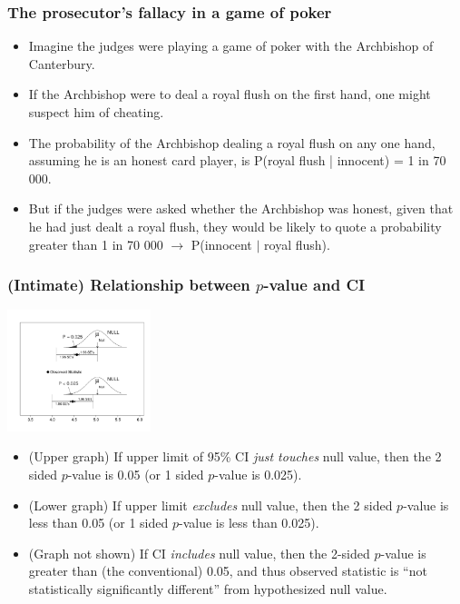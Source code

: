 \documentclass[10pt,handout]{beamer}\usepackage[]{graphicx}\usepackage[]{color}
\begin{document}
\begin{frame}
	\frametitle{The prosecutor's fallacy in a game of poker}
	
	\begin{itemize}
		\setlength\itemsep{1em}
		\item  Imagine the judges were playing a game of poker with the Archbishop of Canterbury. 
		\item If the Archbishop were to deal a royal flush on the first hand, one might suspect him of cheating. \pause 
		\item The probability of the Archbishop dealing a royal flush on any one hand, assuming he is an honest card player, is P(royal flush | innocent) = 1 in 70 000. \pause 
		\item But if the judges were asked whether the Archbishop was honest, given that he had just dealt a royal flush, they would be likely to quote a probability greater than 1 in 70 000 $\to$ P(innocent $|$ royal flush). 
	\end{itemize}
	
\end{frame}


\begin{frame}
	\frametitle{(Intimate) Relationship between $p$-value and CI}
	\begin{center}
		\includegraphics[width=1.65in]{P-CI.pdf}
	\end{center} 
	\begin{footnotesize}
		\begin{itemize}
			\item
			(Upper graph) If upper limit of 95\% CI\textit{ just touches} null value, then
			the 2 sided $p$-value is 0.05 (or 1 sided $p$-value is 0.025). \pause
			\item
			(Lower graph) If upper limit \textit{excludes} null value, then
			the 2 sided $p$-value is less than 0.05 (or 1 sided $p$-value is less than 0.025). \pause
			\item
			(Graph not shown) If  CI \textit{includes} null value, then the 2-sided $p$-value is greater than (the conventional) 0.05, and thus observed statistic is ``not statistically significantly different'' from hypothesized null value. 
		\end{itemize}
	\end{footnotesize}
\end{frame}
\end{document}
